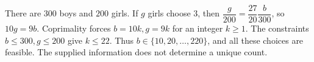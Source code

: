 There are $ 300 $ boys and $ 200 $ girls. If $ g $ girls choose 3, then $\dfrac{g}{200}=\dfrac{27}{20}\dfrac{b}{300}$, so $ 10g=9b $. Coprimality forces $ b=10k,g=9k $ for an integer $ k\ge1 $. The constraints $ b\le300,g\le200 $ give $ k\le22 $. Thus $\boxed{b\in\{10,20,\ldots,220\}}$, and all these choices are feasible. The supplied information does not determine a unique count.
